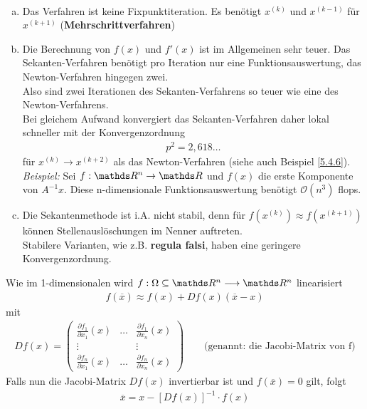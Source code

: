 \begin{Beme}~
  \begin{enumerate}[a)]
  \item Das Verfahren ist keine Fixpunktiteration.
    Es benötigt $x^{(k)}$ und $x^{(k-1)}$ für $x^{(k+1)}$
    (\textbf{Mehrschrittverfahren})
  \item Die Berechnung von $f(x)$ und $f'(x)$ ist im Allgemeinen
    sehr teuer. Das Sekanten-Verfahren benötigt pro Iteration
    nur eine Funktionsauswertung, das Newton-Verfahren hingegen zwei.\\
    Also sind zwei Iterationen des Sekanten-Verfahrens so teuer wie eine
    des Newton-Verfahrens. \\
    Bei gleichem Aufwand konvergiert das Sekanten-Verfahren daher lokal
    schneller mit der Konvergenzordnung 
    \begin{gather*}
      p^2= 2,618\dotsc
    \end{gather*}
    für $x^{(k)}\rightarrow x^{(k+2)}$ als das Newton-Verfahren
    (siehe auch Beispiel \ref{5.4.6}).\\
    
    \textit{Beispiel:} Sei $f:\R^n\rightarrow\R$ und $f(x)$ die erste Komponente von $ A^{-1}x$.
    Diese n-dimensionale Funktionsauswertung benötigt $\mathcal{O}(n^3)$ flops.
  \item Die Sekantenmethode ist i.A. nicht stabil, denn für $f(x^{(k)})\approx f(x^{(k+1)})$
    können Stellenauslöschungen im Nenner auftreten. \\
    Stabilere Varianten, wie z.B. \textbf{regula falsi}, haben eine geringere Konvergenzordnung.
  \end{enumerate}
\end{Beme}



 
Wie im 1-dimensionalen wird $f:\Omega\subseteq \R^n \longrightarrow\R^n$
linearisiert 
\begin{gather}
  f(\overline{x}) \approx f(x) +Df(x)(\overline{x}-x)
  \label{V.5.1}
\end{gather}
mit
\begin{gather*}
  Df(x) = \begin{pmatrix}
    \frac{\partial f_1}{\partial x_1}(x) &\dots & \frac{\partial f_1}{\partial x_n}(x)\\
    \vdots && \vdots\\
    \frac{\partial f_n}{\partial x_1}(x) &\dots & \frac{\partial f_n}{\partial x_n}(x)
  \end{pmatrix}
  \qquad \text{(genannt: die Jacobi-Matrix von f)}
\end{gather*}
Falls nun die Jacobi-Matrix $Df(x)$ invertierbar ist und $f(\overline{x})= 0$ gilt, folgt
\begin{gather*}
  \overline{x} = x-[Df(x)]^{-1}\cdot f(x)
\end{gather*}

